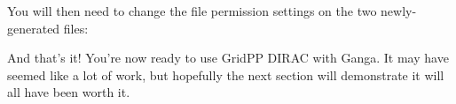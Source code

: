 \begin{Shaded}
\begin{Highlighting}[]
\NormalTok{$ } 
\NormalTok{$ } 
 
 
\NormalTok{$ } 
 
 
 
 
\end{Highlighting}
\end{Shaded}

You will then need to change the file permission settings on the two
newly-generated files:

\begin{Shaded}
\begin{Highlighting}[]
\NormalTok{$ } 
\NormalTok{$ } 
\end{Highlighting}
\end{Shaded}

And that's it! You're now ready to use GridPP DIRAC with Ganga. It may
have seemed like a lot of work, but hopefully the next section
will demonstrate it will all have been worth it.
